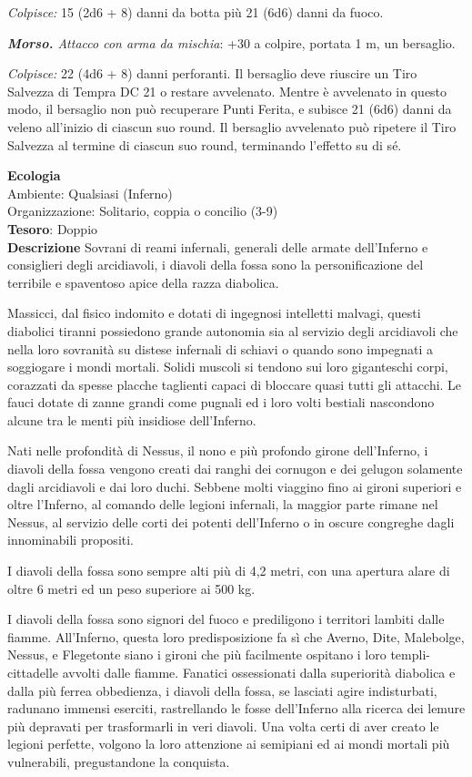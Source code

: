 \begin{multicols}{2}
\textit{Colpisce:} 15 (2d6 + 8) danni da botta più 21 (6d6) danni da fuoco.

\textit{\textbf{Morso.} Attacco con arma da mischia}: +30 a colpire, portata 1 m, un bersaglio.

\textit{Colpisce:} 22 (4d6 + 8) danni perforanti. Il bersaglio deve riuscire un Tiro Salvezza di Tempra DC 21 o restare avvelenato. Mentre è avvelenato in questo modo, il bersaglio non può recuperare Punti Ferita, e subisce 21 (6d6) danni da veleno all'inizio di ciascun suo round. Il bersaglio avvelenato può ripetere il Tiro Salvezza al termine di ciascun suo round, terminando l'effetto su di sé.

\textbf{Ecologia}\\
Ambiente: Qualsiasi (Inferno)\\
Organizzazione: Solitario, coppia o concilio (3-9)\\
\textbf{Tesoro}: Doppio\\
\textbf{Descrizione}
Sovrani di reami infernali, generali delle armate dell'Inferno e consiglieri degli arcidiavoli, i diavoli della fossa sono la personificazione del terribile e spaventoso apice della razza diabolica.

Massicci, dal fisico indomito e dotati di ingegnosi intelletti malvagi, questi diabolici tiranni possiedono grande autonomia sia al servizio degli arcidiavoli che nella loro sovranità su distese infernali di schiavi o quando sono impegnati a soggiogare i mondi mortali. Solidi muscoli si tendono sui loro giganteschi corpi, corazzati da spesse placche taglienti capaci di bloccare quasi tutti gli attacchi. Le fauci dotate di zanne grandi come pugnali ed i loro volti bestiali nascondono alcune tra le menti più insidiose dell'Inferno.

Nati nelle profondità di Nessus, il nono e più profondo girone dell'Inferno, i diavoli della fossa vengono creati dai ranghi dei cornugon e dei gelugon solamente dagli arcidiavoli e dai loro duchi. Sebbene molti viaggino fino ai gironi superiori e oltre l'Inferno, al comando delle legioni infernali, la maggior parte rimane nel Nessus, al servizio delle corti dei potenti dell'Inferno o in oscure congreghe dagli innominabili propositi.

I diavoli della fossa sono sempre alti più di 4,2 metri, con una apertura alare di oltre 6 metri ed un peso superiore ai 500 kg.

I diavoli della fossa sono signori del fuoco e prediligono i territori lambiti dalle fiamme. All'Inferno, questa loro predisposizione fa sì che Averno, Dite, Malebolge, Nessus, e Flegetonte siano i gironi che più facilmente ospitano i loro templi-cittadelle avvolti dalle fiamme. Fanatici ossessionati dalla superiorità diabolica e dalla più ferrea obbedienza, i diavoli della fossa, se lasciati agire indisturbati, radunano immensi eserciti, rastrellando le fosse dell'Inferno alla ricerca dei lemure più depravati per trasformarli in veri diavoli. Una volta certi di aver creato le legioni perfette, volgono la loro attenzione ai semipiani ed ai mondi mortali più vulnerabili, pregustandone la conquista.


\end{multicols}
